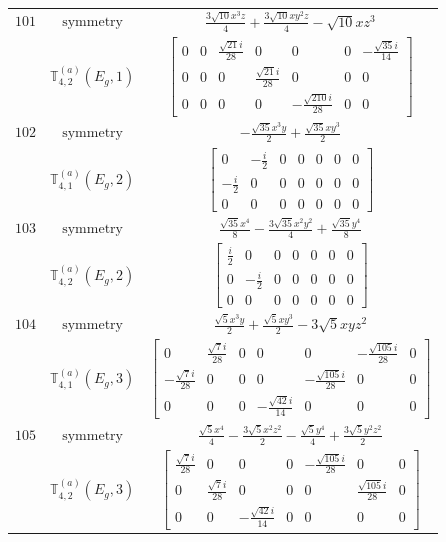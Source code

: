 \documentclass[fleqn,8pt,landscape]{jsarticle}
\begin{document}
\begin{longtable}{ccc}
$ 101 $ & $ \text{symmetry} $ & $ \frac{3 \sqrt{10} x^{3} z}{4} + \frac{3 \sqrt{10} x y^{2} z}{4} - \sqrt{10} x z^{3} $ \\
$  $ & $ \mathbb{T}_{4,2}^{(a)}(E_{g},1) $ & $ \begin{bmatrix} 0 & 0 & \frac{\sqrt{21} i}{28} & 0 & 0 & 0 & - \frac{\sqrt{35} i}{14} \\ 0 & 0 & 0 & \frac{\sqrt{21} i}{28} & 0 & 0 & 0 \\ 0 & 0 & 0 & 0 & - \frac{\sqrt{210} i}{28} & 0 & 0 \end{bmatrix} $ \\ \hline
$ 102 $ & $ \text{symmetry} $ & $ - \frac{\sqrt{35} x^{3} y}{2} + \frac{\sqrt{35} x y^{3}}{2} $ \\
$  $ & $ \mathbb{T}_{4,1}^{(a)}(E_{g},2) $ & $ \begin{bmatrix} 0 & - \frac{i}{2} & 0 & 0 & 0 & 0 & 0 \\ - \frac{i}{2} & 0 & 0 & 0 & 0 & 0 & 0 \\ 0 & 0 & 0 & 0 & 0 & 0 & 0 \end{bmatrix} $ \\ \hline
$ 103 $ & $ \text{symmetry} $ & $ \frac{\sqrt{35} x^{4}}{8} - \frac{3 \sqrt{35} x^{2} y^{2}}{4} + \frac{\sqrt{35} y^{4}}{8} $ \\
$  $ & $ \mathbb{T}_{4,2}^{(a)}(E_{g},2) $ & $ \begin{bmatrix} \frac{i}{2} & 0 & 0 & 0 & 0 & 0 & 0 \\ 0 & - \frac{i}{2} & 0 & 0 & 0 & 0 & 0 \\ 0 & 0 & 0 & 0 & 0 & 0 & 0 \end{bmatrix} $ \\ \hline
$ 104 $ & $ \text{symmetry} $ & $ \frac{\sqrt{5} x^{3} y}{2} + \frac{\sqrt{5} x y^{3}}{2} - 3 \sqrt{5} x y z^{2} $ \\
$  $ & $ \mathbb{T}_{4,1}^{(a)}(E_{g},3) $ & $ \begin{bmatrix} 0 & \frac{\sqrt{7} i}{28} & 0 & 0 & 0 & - \frac{\sqrt{105} i}{28} & 0 \\ - \frac{\sqrt{7} i}{28} & 0 & 0 & 0 & - \frac{\sqrt{105} i}{28} & 0 & 0 \\ 0 & 0 & 0 & - \frac{\sqrt{42} i}{14} & 0 & 0 & 0 \end{bmatrix} $ \\ \hline
$ 105 $ & $ \text{symmetry} $ & $ \frac{\sqrt{5} x^{4}}{4} - \frac{3 \sqrt{5} x^{2} z^{2}}{2} - \frac{\sqrt{5} y^{4}}{4} + \frac{3 \sqrt{5} y^{2} z^{2}}{2} $ \\
$  $ & $ \mathbb{T}_{4,2}^{(a)}(E_{g},3) $ & $ \begin{bmatrix} \frac{\sqrt{7} i}{28} & 0 & 0 & 0 & - \frac{\sqrt{105} i}{28} & 0 & 0 \\ 0 & \frac{\sqrt{7} i}{28} & 0 & 0 & 0 & \frac{\sqrt{105} i}{28} & 0 \\ 0 & 0 & - \frac{\sqrt{42} i}{14} & 0 & 0 & 0 & 0 \end{bmatrix} $ \\ \hline

\end{longtable}
\end{document}

